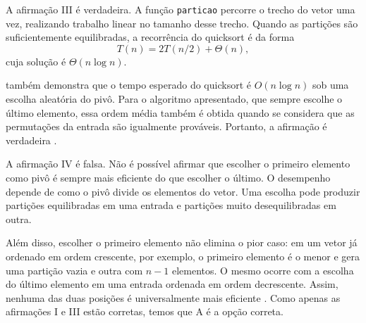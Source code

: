 \documentclass[12pt,a4paper]{article}
\begin{document}
A afirmação III é verdadeira.
A função \texttt{particao} percorre o trecho do vetor uma vez,
realizando trabalho linear no tamanho desse trecho.
Quando as partições são suficientemente equilibradas, a recorrência do quicksort é da forma
\[
    T(n) = 2T(n/2) + \Theta(n),
\]
cuja solução é $\Theta(n \log n)$.

\textcite{clrs2022} também demonstra que o tempo esperado do quicksort é $O(n \log n)$ sob uma escolha aleatória do pivô.
Para o algoritmo apresentado, que sempre escolhe o último elemento,
essa ordem média também é obtida quando se considera que as permutações da entrada são igualmente prováveis.
Portanto, a afirmação é verdadeira \parencite[seç.~7.4.2]{clrs2022}.

A afirmação IV é falsa.
Não é possível afirmar que escolher o primeiro elemento como pivô é sempre mais eficiente do que escolher o último.
O desempenho depende de como o pivô divide os elementos do vetor.
Uma escolha pode produzir partições equilibradas em uma entrada e partições muito desequilibradas em outra.

Além disso, escolher o primeiro elemento não elimina o pior caso:
em um vetor já ordenado em ordem crescente, por exemplo,
o primeiro elemento é o menor e gera uma partição vazia e outra com $n-1$ elementos.
O mesmo ocorre com a escolha do último elemento em uma entrada ordenada em ordem decrescente.
Assim, nenhuma das duas posições é universalmente mais eficiente \parencite[seç.~7.2]{clrs2022}.
Como apenas as afirmações I e III estão corretas, temos que A é a opção correta.

\printbibliography[heading=bibintoc]
\end{document}
